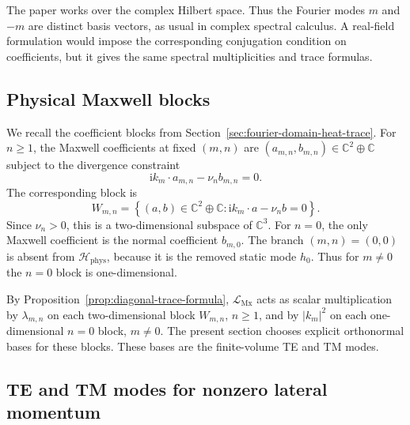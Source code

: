\documentclass[11pt]{article}
\providecommand{\C}{\mathbb{C}}
\providecommand{\ii}{\mathrm{i}}
\providecommand{\abs}[1]{\left\lvert #1\right\rvert}
\providecommand{\set}[1]{\left\{#1\right\}}
\providecommand{\Hphys}{\mathcal H_{\mathrm{phys}}}
\providecommand{\hzero}{h_0}
\providecommand{\LMx}{\mathcal L_{\mathrm{Mx}}}
\providecommand{\lambdamn}{\lambda_{m,n}}
\numberwithin{equation}{section}
\begin{document}
\begin{remark}
\label{rem:complex-mode-convention-section05}
The paper works over the complex Hilbert space.  Thus the Fourier modes
\(m\) and \(-m\) are distinct basis vectors, as usual in complex spectral
calculus.  A real-field formulation would impose the corresponding conjugation
condition on coefficients, but it gives the same spectral multiplicities and
trace formulas.
\end{remark}

\subsection{Physical Maxwell blocks}
\label{subsec:physical-maxwell-blocks-section05}

We recall the coefficient blocks from Section~\ref{sec:fourier-domain-heat-trace}.  For
\(n\geq1\), the Maxwell coefficients at fixed \((m,n)\) are
\((a_{m,n},b_{m,n})\in\C^2\oplus\C\) subject to the divergence constraint
\begin{equation}
    \ii k_m\cdot a_{m,n}-\nu_n b_{m,n}=0 .
    \label{eq:divergence-block-section05}
\end{equation}
The corresponding block is
\begin{equation}
    W_{m,n}
    =
    \set{(a,b)\in\C^2\oplus\C:
          \ii k_m\cdot a-\nu_n b=0}.
    \label{eq:Wmn-section05}
\end{equation}
Since \(\nu_n>0\), this is a two-dimensional subspace of \(\C^3\).  For
\(n=0\), the only Maxwell coefficient is the normal coefficient \(b_{m,0}\).
The branch \((m,n)=(0,0)\) is absent from \(\Hphys\), because it is the removed
static mode \(\hzero\).  Thus for \(m\ne0\) the \(n=0\) block is one-dimensional.

By Proposition~\ref{prop:diagonal-trace-formula}, \(\LMx\) acts as scalar
multiplication by \(\lambdamn\) on each two-dimensional block \(W_{m,n}\),
\(n\geq1\), and by \(\abs{k_m}^2\) on each one-dimensional \(n=0\) block,
\(m\ne0\).  The present section chooses explicit orthonormal bases for these
blocks.  These bases are the finite-volume TE and TM modes.

\subsection{TE and TM modes for nonzero lateral momentum}
\label{subsec:te-tm-nonzero-lateral-momentum}
\end{document}
